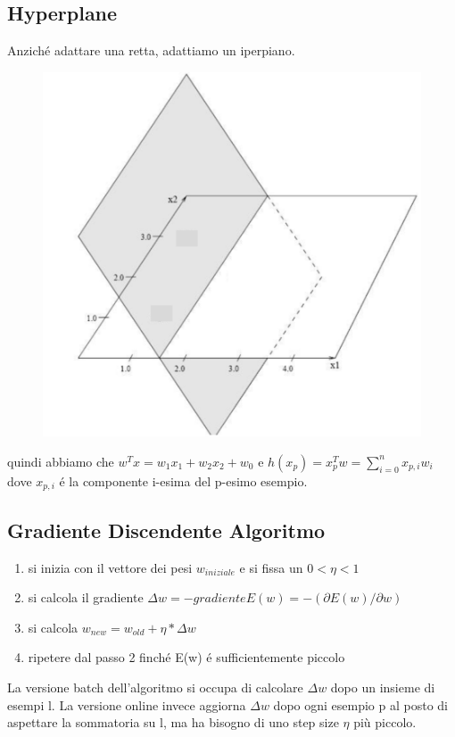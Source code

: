 \documentclass{article}
\begin{document}
\subsection{Hyperplane}
Anziché adattare una retta, adattiamo un iperpiano. 
\begin{figure}[H]
    \centering
    \includegraphics[scale=0.4]{Images/iperpiano.png}
\end{figure}
quindi abbiamo che $w^Tx = w_1x_1 + w_2x_2 + w_0$ e $h(x_p) = x_p^Tw=\sum_{i = 0}^n x_{p,i} w_i$
dove $x_{p,i}$ é la componente i-esima del p-esimo esempio.

\subsection{Gradiente Discendente Algoritmo}
\begin{enumerate}
    \item si inizia con il vettore dei pesi $w_{iniziale}$ e si fissa un $0<\eta <1$
    \item si calcola il gradiente $\Delta w = -gradienteE(w) = -(\partial E(w) / \partial w)$
    \item si calcola $w_{new} = w_{old} + \eta * \Delta w$
    \item ripetere dal passo 2 finché E(w) é sufficientemente piccolo
\end{enumerate}
La versione batch dell'algoritmo si occupa di calcolare $\Delta w$ dopo un insieme di esempi l. La versione online invece aggiorna $\Delta w$ dopo ogni esempio p al posto di aspettare la sommatoria su l, ma ha bisogno di uno step size $\eta$ più piccolo. 
\end{document}
